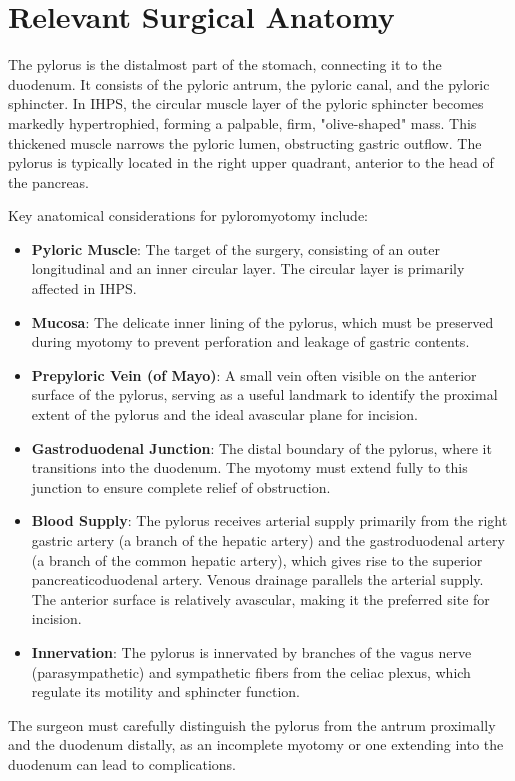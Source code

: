 \section*{Relevant Surgical Anatomy}
The pylorus is the distalmost part of the stomach, connecting it to the duodenum. It consists of the pyloric antrum, the pyloric canal, and the pyloric sphincter. In IHPS, the circular muscle layer of the pyloric sphincter becomes markedly hypertrophied, forming a palpable, firm, "olive-shaped" mass. This thickened muscle narrows the pyloric lumen, obstructing gastric outflow. The pylorus is typically located in the right upper quadrant, anterior to the head of the pancreas.

Key anatomical considerations for pyloromyotomy include:
\begin{itemize}
  \item \textbf{Pyloric Muscle}: The target of the surgery, consisting of an outer longitudinal and an inner circular layer. The circular layer is primarily affected in IHPS.
  \item \textbf{Mucosa}: The delicate inner lining of the pylorus, which must be preserved during myotomy to prevent perforation and leakage of gastric contents.
  \item \textbf{Prepyloric Vein (of Mayo)}: A small vein often visible on the anterior surface of the pylorus, serving as a useful landmark to identify the proximal extent of the pylorus and the ideal avascular plane for incision.
  \item \textbf{Gastroduodenal Junction}: The distal boundary of the pylorus, where it transitions into the duodenum. The myotomy must extend fully to this junction to ensure complete relief of obstruction.
  \item \textbf{Blood Supply}: The pylorus receives arterial supply primarily from the right gastric artery (a branch of the hepatic artery) and the gastroduodenal artery (a branch of the common hepatic artery), which gives rise to the superior pancreaticoduodenal artery. Venous drainage parallels the arterial supply. The anterior surface is relatively avascular, making it the preferred site for incision.
  \item \textbf{Innervation}: The pylorus is innervated by branches of the vagus nerve (parasympathetic) and sympathetic fibers from the celiac plexus, which regulate its motility and sphincter function.
\end{itemize}
The surgeon must carefully distinguish the pylorus from the antrum proximally and the duodenum distally, as an incomplete myotomy or one extending into the duodenum can lead to complications.

